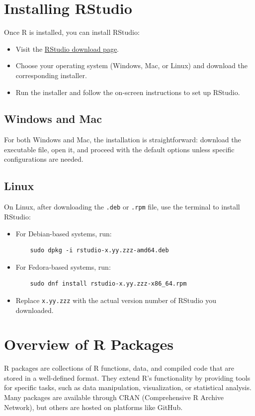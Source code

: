 \documentclass[12pt]{book}
\begin{document}
\section{Installing RStudio}
Once R is installed, you can install RStudio:
\begin{itemize}
    \item Visit the \href{https://www.rstudio.com/products/rstudio/download/#download}{RStudio download page}.
    \item Choose your operating system (Windows, Mac, or Linux) and download the corresponding installer.
    \item Run the installer and follow the on-screen instructions to set up RStudio.
\end{itemize}

\subsection{Windows and Mac}
For both Windows and Mac, the installation is straightforward: download the executable file, open it, and proceed with the default options unless specific configurations are needed.

\subsection{Linux}
On Linux, after downloading the \texttt{.deb} or \texttt{.rpm} file, use the terminal to install RStudio:
\begin{itemize}
    \item For Debian-based systems, run:
    \begin{verbatim}
    sudo dpkg -i rstudio-x.yy.zzz-amd64.deb
    \end{verbatim}
    \item For Fedora-based systems, run:
    \begin{verbatim}
    sudo dnf install rstudio-x.yy.zzz-x86_64.rpm
    \end{verbatim}
    \item Replace \texttt{x.yy.zzz} with the actual version number of RStudio you downloaded.
\end{itemize}

\section{Overview of R Packages}
R packages are collections of R functions, data, and compiled code that are stored in a well-defined format. They extend R's functionality by providing tools for specific tasks, such as data manipulation, visualization, or statistical analysis. Many packages are available through CRAN (Comprehensive R Archive Network), but others are hosted on platforms like GitHub.
\end{document}
